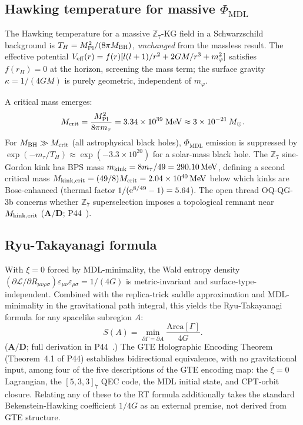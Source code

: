 \documentclass[11pt]{article}
\theoremstyle{remark}
\newcommand{\PHIMDL}{\Phi_{\mathrm{MDL}}}
\newcommand{\ZS}{\mathbb{Z}_7}
\newcommand{\CatAD}{\textbf{A/D}}
\begin{document}
\subsection{Hawking temperature for massive $\PHIMDL$}
\label{ssec:hawking}

The Hawking temperature for a massive $\ZS$-KG field in a Schwarzschild background
is $T_H = M_{\rm Pl}^2/(8\pi M_{\rm BH})$, \emph{unchanged} from the massless result.
The effective potential $V_{\rm eff}(r) = f(r)[l(l+1)/r^2 + 2GM/r^3 + m_\varphi^2]$
satisfies $f(r_H)=0$ at the horizon, screening the mass term; the surface gravity
$\kappa = 1/(4GM)$ is purely geometric, independent of $m_\varphi$.

A critical mass emerges:
\begin{equation}
  M_{\rm crit} = \frac{M_{\rm Pl}^2}{8\pi m_\tau}
  = 3.34\times10^{39}\;\text{MeV}
  \approx 3\times10^{-21}\,M_\odot.
\end{equation}
For $M_{\rm BH} \gg M_{\rm crit}$ (all astrophysical black holes), $\PHIMDL$
emission is suppressed by $\exp(-m_\tau/T_H) \approx \exp(-3.3\times10^{20})$
for a solar-mass black hole.
The $\ZS$ sine-Gordon kink has BPS mass $m_{\rm kink} = 8m_\tau/49 = 290.10\,\text{MeV}$,
defining a second critical mass $M_{\rm kink,crit} = (49/8)M_{\rm crit} = 2.04\times10^{40}\,\text{MeV}$
below which kinks are Bose-enhanced (thermal factor $1/({\rm e}^{8/49}-1) = 5.64$).
The open thread OQ-QG-3b concerns whether $\ZS$ superselection imposes a topological remnant
near $M_{\rm kink,crit}$ ($\CatAD$; P44~\cite{SpivackQGR}).

\subsection{Ryu-Takayanagi formula}
\label{ssec:rt}

With $\xi=0$ forced by MDL-minimality, the Wald entropy density
$(\partial\mathcal{L}/\partial R_{\mu\nu\rho\sigma})\varepsilon_{\mu\nu}\varepsilon_{\rho\sigma}
= 1/(4G)$ is metric-invariant and surface-type-independent.
Combined with the replica-trick saddle approximation and MDL-minimality in
the gravitational path integral, this yields the Ryu-Takayanagi formula for
any spacelike subregion $A$:
\begin{equation}
  S(A) = \min_{\partial\Gamma = \partial A}
  \frac{\mathrm{Area}[\Gamma]}{4G}.
\end{equation}
($\CatAD$; full derivation in P44~\cite{SpivackQGR}.)
The GTE Holographic Encoding Theorem (Theorem~4.1 of P44) establishes bidirectional
equivalence, with no gravitational input, among four of the five descriptions of
the GTE encoding map: the $\xi=0$ Lagrangian, the $[5,3,3]_7$ QEC code, the MDL
initial state, and CPT-orbit closure.  Relating any of these to the RT formula
additionally takes the standard Bekenstein-Hawking coefficient $1/4G$ as an
external premise, not derived from GTE structure.
\end{document}
